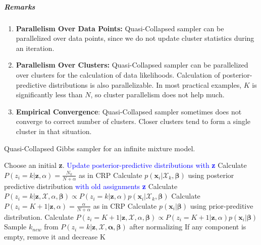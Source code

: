 \documentclass[12pt, a4paper]{article}
\begin{document}
\subparagraph{Remarks}
\begin{enumerate}
   \item  \textbf{Parallelism Over Data Points:} Quasi-Collapsed sampler can be parallelized over data points, since we do not update cluster statistics during an iteration.
   \item  \textbf{Parallelism Over Clusters:} Quasi-Collapsed sampler can be parallelized over clusters for the calculation of data likelihoods. Calculation of posterior-predictive distributions is also parallelizable. In most practical examples, $K$ is significantly less than $N$, so cluster parallelism does not help much.
   \item  \textbf{Empirical Convergence}: Quasi-Collapsed sampler sometimes does not converge to correct number of clusters. Closer clusters tend to form a single cluster in that situation.
\end{enumerate}

\begin{algorithm}[H]
  \caption{Quasi-Collapsed Gibbs sampler for an infinite mixture model.}\label{quasicollapsedgibbs}
  \begin{algorithmic}[1]
  \State Choose an initial \textbf{z}.
   
    \State \textcolor{blue}{Update posterior-predictive distributions with \textbf{z}}
         
            \State Calculate $P(z_i = k | \mathbf{z},\alpha) = \frac{N_{k}}{N+\alpha}$ as in CRP
            \State Calculate $p(\mathbf{x}_i|\mathcal{X}_{k},\mathbf{\beta})$ using posterior predictive distribution \textcolor{blue}{with old assignments \textbf{z}}
            \State Calculate $P(z_i = k | \mathbf{z},\mathcal{X},\alpha,\mathbf{\beta}) \propto P(z_i = k | \mathbf{z},\alpha) p(\mathbf{x}_i|\mathcal{X}_{k}, \mathbf{\beta})$
        \EndFor
        \State Calculate $P(z_i = K+1 | \mathbf{z},\alpha) = \frac{\alpha}{N+\alpha}$ as in CRP 
        \State Calculate $p(\mathbf{x}_i|\mathbf{\beta})$ using prior-preditive distribution.
        \State Calculate $P(z_i = K+1 | \mathbf{z},\mathcal{X},\alpha, \mathbf{\beta}) \propto P(z_i = K+1 | \mathbf{z},\alpha)p(\mathbf{x}_i|\mathbf{\beta})$
        \State Sample $k_{new}$ from $P(z_i = k | \mathbf{z},\mathcal{X},\mathbf{\alpha},\mathbf{\beta})$ after normalizing
    \EndFor
    \State If any component is empty, remove it and decrease K

  \EndFor
  \end{algorithmic}
\end{algorithm}
\end{document}
